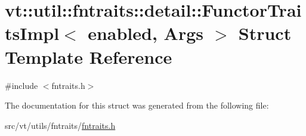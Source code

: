 \hypertarget{structvt_1_1util_1_1fntraits_1_1detail_1_1_functor_traits_impl}{}\section{vt\+:\+:util\+:\+:fntraits\+:\+:detail\+:\+:Functor\+Traits\+Impl$<$ enabled, Args $>$ Struct Template Reference}
\label{structvt_1_1util_1_1fntraits_1_1detail_1_1_functor_traits_impl}


{\ttfamily \#include $<$fntraits.\+h$>$}



The documentation for this struct was generated from the following file\+:\begin{DoxyCompactItemize}
\item 
src/vt/utils/fntraits/\hyperlink{fntraits_8h}{fntraits.\+h}\end{DoxyCompactItemize}
